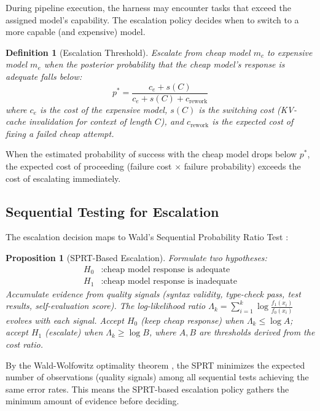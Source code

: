 \documentclass[11pt, a4paper, copyright]{googledeepmind}
\newtheorem{definition}{Definition}[section]
\newtheorem{proposition}{Proposition}[section]
\begin{document}
During pipeline execution, the harness may encounter tasks that exceed the assigned model's capability. The escalation policy decides when to switch to a more capable (and expensive) model.

\begin{definition}[Escalation Threshold]
Escalate from cheap model $m_c$ to expensive model $m_e$ when the posterior probability that the cheap model's response is adequate falls below:
\begin{equation}
\label{eq:escalation}
p^* = \frac{c_e + s(C)}{c_e + s(C) + c_{\mathrm{rework}}}
\end{equation}
where $c_e$ is the cost of the expensive model, $s(C)$ is the switching cost (KV-cache invalidation for context of length $C$), and $c_{\mathrm{rework}}$ is the expected cost of fixing a failed cheap attempt.
\end{definition}

When the estimated probability of success with the cheap model drops below $p^*$, the expected cost of proceeding (failure cost $\times$ failure probability) exceeds the cost of escalating immediately.

\subsection{Sequential Testing for Escalation}

The escalation decision maps to Wald's Sequential Probability Ratio Test \citep{wald1945}:

\begin{proposition}[SPRT-Based Escalation]
\label{prop:sprt}
Formulate two hypotheses:
\begin{align}
H_0&: \text{cheap model response is adequate} \\
H_1&: \text{cheap model response is inadequate}
\end{align}
Accumulate evidence from quality signals (syntax validity, type-check pass, test results, self-evaluation score). The log-likelihood ratio $\Lambda_k = \sum_{i=1}^k \log \frac{f_1(x_i)}{f_0(x_i)}$ evolves with each signal. Accept $H_0$ (keep cheap response) when $\Lambda_k \leq \log A$; accept $H_1$ (escalate) when $\Lambda_k \geq \log B$, where $A, B$ are thresholds derived from the cost ratio.
\end{proposition}

By the Wald-Wolfowitz optimality theorem \citep{waldwolfowitz1948}, the SPRT minimizes the expected number of observations (quality signals) among all sequential tests achieving the same error rates. This means the SPRT-based escalation policy gathers the minimum amount of evidence before deciding.
\end{document}
